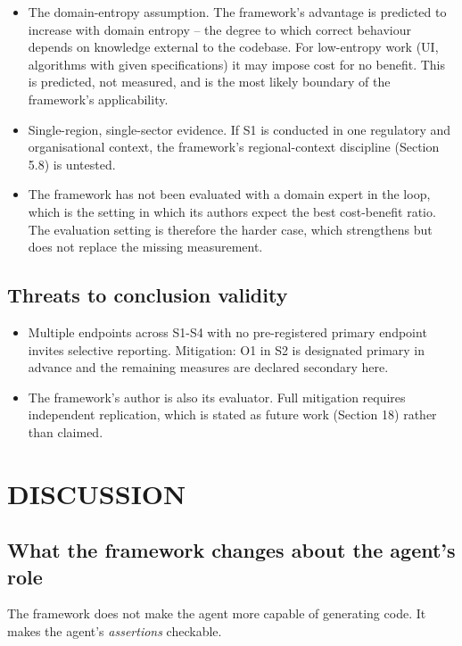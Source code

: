 \documentclass[11pt,a4paper]{article}
\begin{document}
\begin{itemize}[leftmargin=*,nosep,topsep=2pt]
\item The domain-entropy assumption. The framework's advantage is predicted to   increase with domain entropy -- the degree to which correct behaviour depends   on knowledge external to the codebase. For low-entropy work (UI, algorithms   with given specifications) it may impose cost for no benefit. This is   predicted, not measured, and is the most likely boundary of the framework's   applicability.
\item Single-region, single-sector evidence. If S1 is conducted in one regulatory   and organisational context, the framework's regional-context discipline   (Section 5.8) is untested.
\item The framework has not been evaluated with a domain expert in the loop, which   is the setting in which its authors expect the best cost-benefit ratio. The   evaluation setting is therefore the harder case, which strengthens but does   not replace the missing measurement.
\end{itemize}

\subsection{Threats to conclusion validity}

\begin{itemize}[leftmargin=*,nosep,topsep=2pt]
\item Multiple endpoints across S1-S4 with no pre-registered primary endpoint   invites selective reporting. Mitigation: O1 in S2 is designated primary in   advance and the remaining measures are declared secondary here.
\item The framework's author is also its evaluator. Full mitigation requires   independent replication, which is stated as future work (Section 18) rather   than claimed.
\end{itemize}

\section{DISCUSSION}

\subsection{What the framework changes about the agent's role}

The framework does not make the agent more capable of generating code. It makes the agent's \emph{assertions} checkable.
\end{document}
